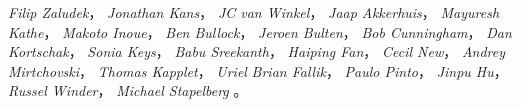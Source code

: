 \emph{Filip Zaludek}，
\emph{Jonathan Kans}，
\emph{JC van Winkel}，
\emph{Jaap Akkerhuis}，
\emph{Mayuresh Kathe}，
\emph{Makoto Inoue}，
\emph{Ben Bullock}，
\emph{Jeroen Bulten}，
\emph{Bob Cunningham}，
\emph{Dan Kortschak}，
\emph{Sonia Keys}，
\emph{Babu Sreekanth}，
\emph{Haiping Fan}，
\emph{Cecil New}，
\emph{Andrey Mirtchovski}，
\emph{Thomas Kapplet}，
\emph{Uriel}
\emph{Brian Fallik}，
\emph{Paulo Pinto}，
\emph{Jinpu Hu}，
\emph{Russel Winder}，
\emph{Michael Stapelberg} 。
